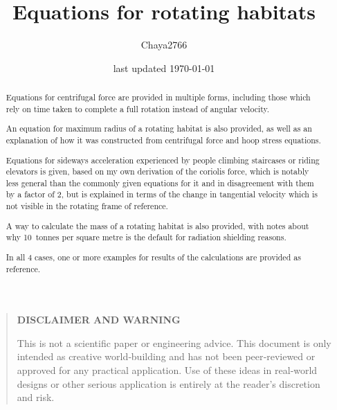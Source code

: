 \documentclass[a4paper]{article}
\title{Equations for rotating habitats}
\author{Chaya2766}
\date{last updated \today}
\begin{document}
	\sffamily
	\sloppy
	
	\maketitle
	
	\vfill
	
	\begin{abstract}
		Equations for centrifugal force are provided in multiple forms, including those which rely on time taken to complete a full rotation instead of angular velocity.
		
		\medskip
		
		An equation for maximum radius of a rotating habitat is also provided, as well as an explanation of how it was constructed from centrifugal force and hoop stress equations.
		
		\medskip
		
		Equations for sideways acceleration experienced by people climbing staircases or riding elevators is given, based on my own derivation of the coriolis force, which is notably less general than the commonly given equations for it and in disagreement with them by a factor of 2, but is explained in terms of the change in tangential velocity which is not visible in the rotating frame of reference.
		
		\medskip
		
		A way to calculate the mass of a rotating habitat is also provided, with notes about why 10~tonnes per square metre is the default for radiation shielding reasons.
		
		\medskip
		
		In all 4 cases, one or more examples for results of the calculations are provided as reference.
		
		\medskip
	\end{abstract}
	
	\vfill
	
	\begin{quote}
		\begin{center}
			\textbf{DISCLAIMER AND WARNING}
		\end{center}
		
		This is not a scientific paper or engineering advice.
		This document is only intended as creative world‑building and has not been peer‑reviewed or approved for any practical application.
		Use of these ideas in real‑world designs or other serious application is entirely at the reader’s discretion and risk.
	\end{quote}
	
\end{document}
